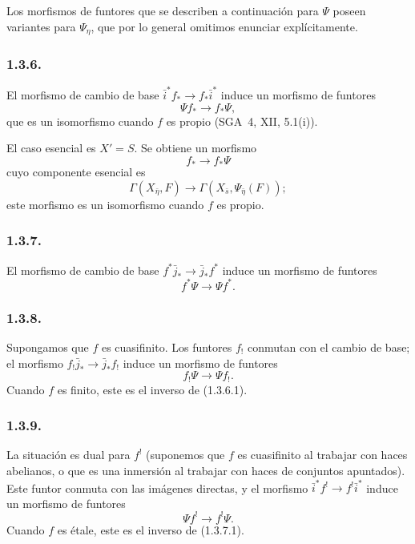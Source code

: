 Los morfismos de funtores que se describen a continuación para $\Psi$ poseen
variantes para $\Psi_\eta$, que por lo general omitimos enunciar
explícitamente.

\pageoriginale

\subsubsection*{1.3.6.}
El morfismo de cambio de base
$\bar i^*f_*\longrightarrow f_*\bar i^*$ induce un morfismo de funtores
\begin{equation}\tag{1.3.6.1}
\Psi f_*\longrightarrow f_*\Psi,
\end{equation}
que es un isomorfismo cuando $f$ es propio (SGA~4, XII, 5.1(i)).

El caso esencial es $X'=S$. Se obtiene un morfismo
\begin{equation}\tag{1.3.6.2}
f_*\longrightarrow f_*\Psi
\end{equation}
cuyo componente esencial es
\begin{equation}\tag{1.3.6.3}
\Gamma(X_{\bar\eta},F)
\longrightarrow
\Gamma(X_{\bar s},\Psi_{\bar\eta}(F));
\end{equation}
este morfismo es un isomorfismo cuando $f$ es propio.

\subsubsection*{1.3.7.}
El morfismo de cambio de base
$f^*\bar j_*\longrightarrow\bar j_*f^*$ induce un morfismo de funtores
\begin{equation}\tag{1.3.7.1}
f^*\Psi\longrightarrow\Psi f^*.
\end{equation}

\subsubsection*{1.3.8.}
Supongamos que $f$ es cuasifinito. Los funtores $f_!$ conmutan con el cambio
de base; el morfismo $f_!\bar j_*\longrightarrow\bar j_*f_!$ induce un
morfismo de funtores
\begin{equation}\tag{1.3.8.1}
f_!\Psi\longrightarrow\Psi f_!.
\end{equation}
Cuando $f$ es finito, este es el inverso de (1.3.6.1).

\subsubsection*{1.3.9.}
La situación es dual para $f^!$ (suponemos que $f$ es cuasifinito al trabajar
con haces abelianos, o que es una inmersión al trabajar con haces de conjuntos
apuntados). Este funtor conmuta con las imágenes directas, y el morfismo
$\bar i^*f^!\longrightarrow f^!\bar i^*$ induce un morfismo de funtores
\begin{equation}\tag{1.3.9.1}
\Psi f^!\longrightarrow f^!\Psi.
\end{equation}
Cuando $f$ es étale, este es el inverso de (1.3.7.1).

